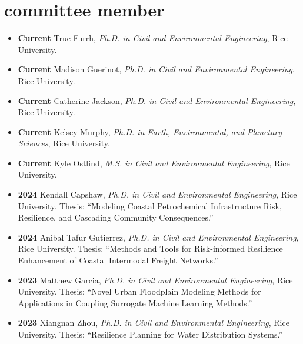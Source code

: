 \documentclass[10pt,oneside]{article}
\begin{document}
\section{committee member}

\mbox{}\vspace{-\dimexpr\baselineskip\relax}

\begin{itemize}[label={}]

  
    \item \textbf{Current} True Furrh, \textit{Ph.D. in Civil and Environmental Engineering}, Rice University. 
  
    \item \textbf{Current} Madison Guerinot, \textit{Ph.D. in Civil and Environmental Engineering}, Rice University. 
  
    \item \textbf{Current} Catherine Jackson, \textit{Ph.D. in Civil and Environmental Engineering}, Rice University. 
  
    \item \textbf{Current} Kelsey Murphy, \textit{Ph.D. in Earth, Environmental, and Planetary Sciences}, Rice University. 
  
    \item \textbf{Current} Kyle Ostlind, \textit{M.S. in Civil and Environmental Engineering}, Rice University. 
  
  
  
    \item \textbf{2024} \quad Kendall Capshaw, \textit{Ph.D. in Civil and Environmental Engineering}, Rice University. Thesis: \enquote{Modeling Coastal Petrochemical Infrastructure Risk, Resilience, and Cascading Community Consequences.}
  
    \item \textbf{2024} \quad Anibal Tafur Gutierrez, \textit{Ph.D. in Civil and Environmental Engineering}, Rice University. Thesis: \enquote{Methods and Tools for Risk-informed Resilience Enhancement of Coastal Intermodal Freight Networks.}
  
    \item \textbf{2023} \quad Matthew Garcia, \textit{Ph.D. in Civil and Environmental Engineering}, Rice University. Thesis: \enquote{Novel Urban Floodplain Modeling Methods for Applications in Coupling Surrogate Machine Learning Methods.}
  
    \item \textbf{2023} \quad Xiangnan Zhou, \textit{Ph.D. in Civil and Environmental Engineering}, Rice University. Thesis: \enquote{Resilience Planning for Water Distribution Systems.}
  

\end{itemize}
\end{document}
